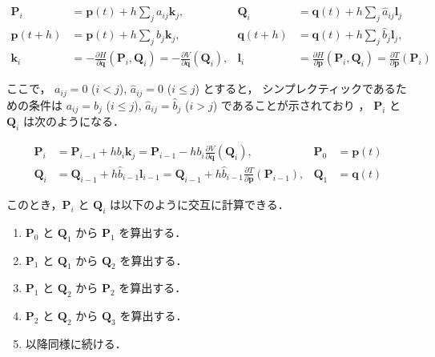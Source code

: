 \begin{align}
    \bm{P}_i    & = \bm{p}(t) + h \sum_{j} a_{ij} \bm{k}_j,                                                                    &
    \bm{Q}_i    & = \bm{q}(t) + h \sum_{j} \hat{a}_{ij} \bm{l}_j                                                                 \\
    \bm{p}(t+h) & = \bm{p}(t) + h \sum_{j} b_{j} \bm{k}_j,                                                                     &
    \bm{q}(t+h) & = \bm{q}(t) + h \sum_{j} \hat{b}_{j} \bm{l}_j,                                                                 \\
    \bm{k}_i    & = -\frac{\partial H}{\partial \bm{q}} (\bm{P}_i, \bm{Q}_i) = -\frac{\partial V}{\partial \bm{q}} (\bm{Q}_i), &
    \bm{l}_i    & = \frac{\partial H}{\partial \bm{p}} (\bm{P}_i, \bm{Q}_i) = \frac{\partial T}{\partial \bm{p}} (\bm{P}_i)
\end{align}

ここで，
$a_{ij} = 0$ ($i < j$), $\hat{a}_{ij} = 0$ ($i \le j$)
とすると，
シンプレクティックであるための条件は
$a_{ij} = b_j$ ($i \le j$), $\hat{a}_{ij} = \hat{b}_j$ ($i > j$)
であることが示されており \cite[Section II.16.]{Hairer1993}，
$\bm{P}_i$ と $\bm{Q}_i$ は次のようになる．

\begin{align}
    \bm{P}_i & = \bm{P}_{i-1} + h b_i \bm{k}_j = \bm{P}_{i-1} - h b_i \frac{\partial V}{\partial \bm{q}} (\bm{Q}_i),                                 &
    \bm{P}_0 & = \bm{p}(t)                                                                                                                             \\
    \bm{Q}_i & = \bm{Q}_{i - 1} + h \hat{b}_{i-1} \bm{l}_{i-1} = \bm{Q}_{i - 1} + h \hat{b}_{i-1} \frac{\partial T}{\partial \bm{p}} (\bm{P}_{i-1}), &
    \bm{Q}_1 & = \bm{q}(t)
\end{align}

このとき，$\bm{P}_i$ と $\bm{Q}_i$ は以下のように交互に計算できる．

\begin{enumerate}
    \item $\bm{P}_0$ と $\bm{Q}_1$ から $\bm{P}_1$ を算出する．
    \item $\bm{P}_1$ と $\bm{Q}_1$ から $\bm{Q}_2$ を算出する．
    \item $\bm{P}_1$ と $\bm{Q}_2$ から $\bm{P}_2$ を算出する．
    \item $\bm{P}_2$ と $\bm{Q}_2$ から $\bm{Q}_3$ を算出する．
    \item 以降同様に続ける．
\end{enumerate}

